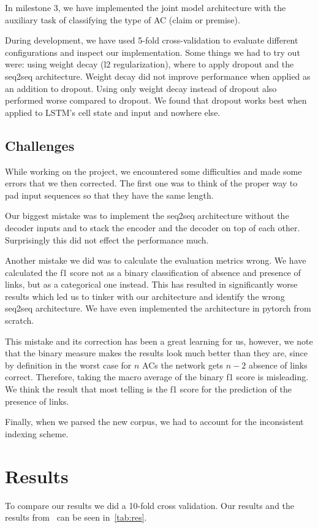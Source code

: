 \documentclass[onecolumn]{article}
\begin{document}
In milestone 3, we have implemented the joint model architecture with the auxiliary task of classifying the type of AC (claim or premise).

During development, we have used 5-fold cross-validation to evaluate different configurations and inspect our implementation.
Some things we had to try out were: using weight decay (l2 regularization), where to apply dropout and the seq2seq architecture.
Weight decay did not improve performance when applied as an addition to dropout.
Using only weight decay instead of dropout also performed worse compared to dropout.
We found that dropout works best when applied to LSTM's cell state and input and nowhere else.

\subsection{Challenges}
While working on the project, we encountered some difficulties and made some errors that we then corrected. The first one
was to think of the proper way to pad input sequences so that they have the same length.

Our biggest mistake was to implement the seq2seq architecture without the decoder inputs and to stack the encoder and the decoder on top of each other. Surprisingly this did not effect the performance much.

Another mistake we did was to calculate the evaluation metrics wrong.
We have calculated the f1 score not as a binary classification of absence and presence of links, but as a categorical one instead.
This has resulted in significantly worse results which led us to tinker with our architecture and identify the wrong seq2seq architecture. We have even implemented the architecture in pytorch from scratch.

This mistake and its correction has been a great learning for us, however, we note that the binary measure makes the results look much better than they are,
since by definition in the worst case for $n$ ACs the network gets $n-2$ absence of links correct. Therefore, taking the macro average of the binary f1 score is misleading. We think the result that most telling is the f1 score for the prediction of the presence of links.

Finally, when we parsed the new corpus, we had to account for the inconsistent indexing scheme.

\section{Results}
To compare our results we did a 10-fold cross validation. Our results and the results from~\cite{potash2017here} can be seen in~\autoref{tab:res}.
\end{document}
